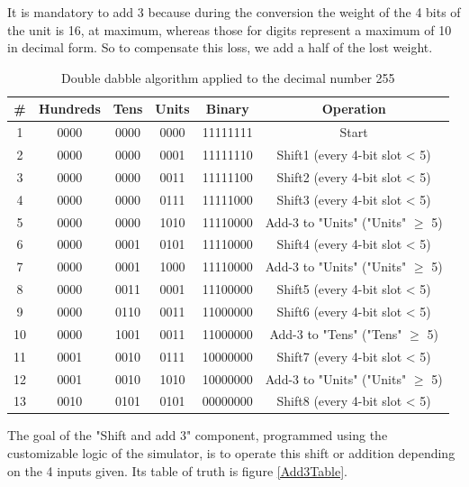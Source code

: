 \documentclass{article}
\begin{document}
It is mandatory to add 3 because during the conversion the weight of the 4 bits of the unit is 16, at maximum, whereas those for digits represent a maximum of 10 in decimal form. So to compensate this loss, we add a half of the lost weight.

\begin{table}[h]
  \centering
  \begin{tabular}{||c|c|c|c||c||c||}
    \hline
    \# & Hundreds & Tens & Units & Binary & Operation \\
    \hline
    1 & 0000 & 0000 & 0000 & 11111111 & Start \\
    2 & 0000 & 0000 & 0001 & 11111110 & Shift1 (every 4-bit slot < 5) \\
    3 & 0000 & 0000 & 0011 & 11111100 & Shift2 (every 4-bit slot < 5) \\ 
    4 & 0000 & 0000 & 0111 & 11111000 & Shift3 (every 4-bit slot < 5) \\
    5 & 0000 & 0000 & 1010 & 11110000 & Add-3 to "Units" ("Units" $\geq$ 5)\\
    6 & 0000 & 0001 & 0101 & 11110000 & Shift4 (every 4-bit slot < 5) \\
    7 & 0000 & 0001 & 1000 & 11110000 & Add-3 to "Units" ("Units" $\geq$ 5)\\
    8 & 0000 & 0011 & 0001 & 11100000 & Shift5 (every 4-bit slot < 5) \\
    9 & 0000 & 0110 & 0011 & 11000000 & Shift6 (every 4-bit slot < 5) \\
    10 & 0000 & 1001 & 0011& 11000000 & Add-3 to "Tens" ("Tens" $\geq$ 5)\\
    11 & 0001 & 0010 & 0111& 10000000 & Shift7 (every 4-bit slot < 5) \\
    12 & 0001 & 0010 & 1010& 10000000 & Add-3 to "Units" ("Units" $\geq$ 5)\\
    13 & 0010 & 0101 & 0101& 00000000 & Shift8 (every 4-bit slot < 5) \\
    \hline
  \end{tabular}
    \label{SC_Algo}
    \caption{Double dabble algorithm applied to the decimal number 255}

  \end{table}


The goal of the "Shift and add 3" component, programmed using the customizable logic of the simulator, is to operate this shift or addition depending on the 4 inputs given. Its table of truth is figure \ref{Add3Table}.
\end{document}
